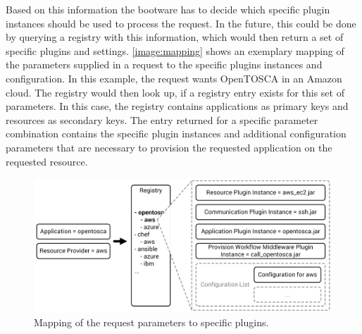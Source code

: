 Based on this information the bootware has to decide which specific plugin instances should be used to process the request.
In the future, this could be done by querying a registry with this information, which would then return a set of specific plugins and settings.
\autoref{image:mapping} shows an exemplary mapping of the parameters supplied in a request to the specific plugins instances and configuration.
In this example, the request wants OpenTOSCA in an Amazon cloud.
The registry would then look up, if a registry entry exists for this set of parameters.
In this case, the registry contains applications as primary keys and resources as secondary keys.
The entry returned for a specific parameter combination contains the specific plugin instances and additional configuration parameters that are necessary to provision the requested application on the requested resource.

\begin{figure}[!htbp]
	\centering
	\includegraphics[resolution=600]{design/assets/mapping}
	\caption{Mapping of the request parameters to specific plugins.}
	\label{image:mapping}
\end{figure}

